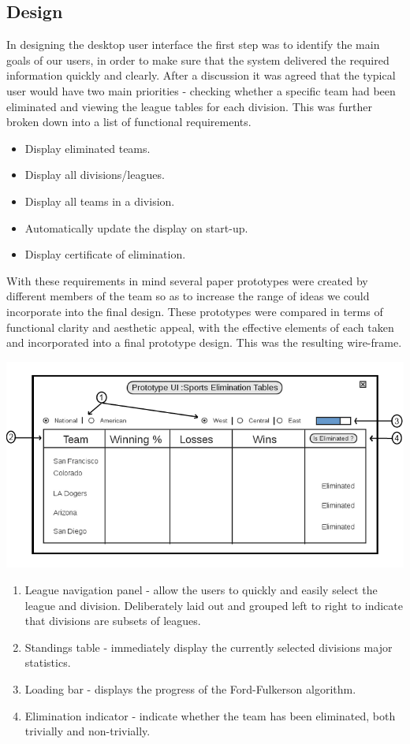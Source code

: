 \subsection{Design}

In designing the desktop user interface the first step was to identify the main
goals of our users, in order to make sure that the system delivered the required
information quickly and clearly. After a discussion it was  agreed that the
typical user would have two main priorities - checking whether a specific team
had been eliminated and viewing the league tables for each division. This was
further broken down into a list of functional requirements.

\begin{itemize}
\item Display eliminated teams.
\item Display all divisions/leagues.
\item Display all teams in a division.
\item Automatically update the display on start-up.
\item Display certificate of elimination.
\end{itemize}

With these requirements in mind several paper prototypes were created by
different members of the team so as to increase the range of ideas we could
incorporate into the final design. These prototypes were compared in terms of
functional clarity and aesthetic appeal, with the effective elements of each
taken and incorporated into a final prototype design. This was the resulting
wire-frame.

\includegraphics[width=\linewidth,keepaspectratio]
{images/Prototype_UI.png}

\begin{enumerate}
\item League navigation panel - allow the users to quickly and easily select the
league and division. Deliberately laid out and grouped left to right to indicate
that divisions are subsets of leagues.
\item Standings table - immediately display the currently selected divisions major
statistics.
\item Loading bar - displays the progress of the Ford-Fulkerson algorithm.
\item Elimination indicator - indicate whether the team has been eliminated, both
trivially and non-trivially.
\end{enumerate}

